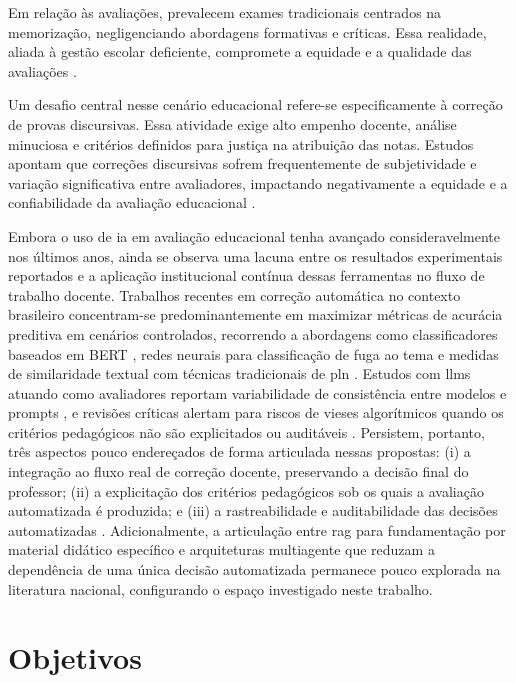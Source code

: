 Em relação às avaliações, prevalecem exames tradicionais centrados na memorização, negligenciando abordagens formativas e críticas. Essa realidade, aliada à gestão escolar deficiente, compromete a equidade e a qualidade das avaliações \cite{santos_articulacao_2016}.

Um desafio central nesse cenário educacional refere-se especificamente à correção de provas discursivas. Essa atividade exige alto empenho docente, análise minuciosa e critérios definidos para justiça na atribuição das notas. Estudos apontam que correções discursivas sofrem frequentemente de subjetividade e variação significativa entre avaliadores, impactando negativamente a equidade e a confiabilidade da avaliação educacional \cite{borges_avaliacao_2017}.


Embora o uso de \gls{ia} em avaliação educacional tenha avançado consideravelmente nos últimos anos, ainda se observa uma lacuna entre os resultados experimentais reportados e a aplicação institucional contínua dessas ferramentas no fluxo de trabalho docente. Trabalhos recentes em correção automática no contexto brasileiro concentram-se predominantemente em maximizar métricas de acurácia preditiva em cenários controlados, recorrendo a abordagens como classificadores baseados em BERT \cite{lima_aesvoting_2024}, redes neurais para classificação de fuga ao tema \cite{pinho_aplicacao_2024} e medidas de similaridade textual com técnicas tradicionais de \gls{pln} \cite{dias_correcao_2023}. Estudos com \gls{llm}s atuando como avaliadores reportam variabilidade de consistência entre modelos e prompts \cite{seo_large_2025}, e revisões críticas alertam para riscos de vieses algorítmicos quando os critérios pedagógicos não são explicitados ou auditáveis \cite{heggler_as_2025}. Persistem, portanto, três aspectos pouco endereçados de forma articulada nessas propostas: (i) a integração ao fluxo real de correção docente, preservando a decisão final do professor; (ii) a explicitação dos critérios pedagógicos sob os quais a avaliação automatizada é produzida; e (iii) a rastreabilidade e auditabilidade das decisões automatizadas \cite{borges_avaliacao_2017, shahzad_comprehensive_2025}. Adicionalmente, a articulação entre \gls{rag} para fundamentação por material didático específico e arquiteturas multiagente que reduzam a dependência de uma única decisão automatizada permanece pouco explorada na literatura nacional, configurando o espaço investigado neste trabalho.

\section{Objetivos}


